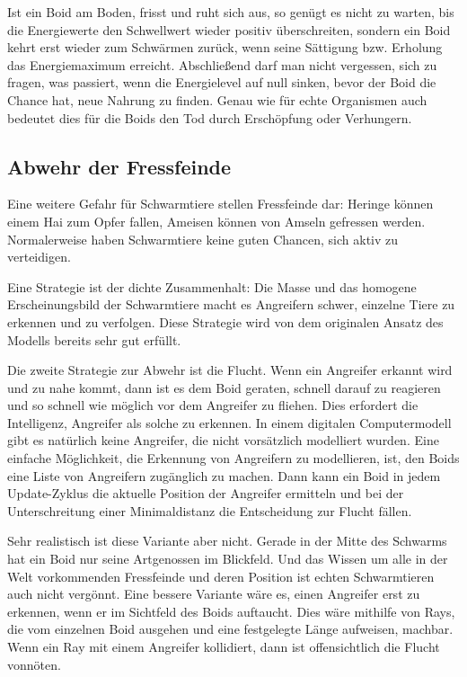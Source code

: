 \documentclass[draft=false
              ,paper=a4
              ,twoside=false
              ,fontsize=11pt
              ,headsepline
              ,BCOR10mm
              ,DIV11
              ,bibtotoc
              ,liststotoc
              ]{scrbook}
\begin{document}
Ist ein Boid am Boden, frisst und ruht sich aus, so genügt es nicht zu warten, bis die Energiewerte den Schwellwert wieder positiv überschreiten, sondern ein Boid kehrt erst wieder zum Schwärmen zurück, wenn seine Sättigung bzw. Erholung das Energiemaximum erreicht.
Abschließend darf man nicht vergessen, sich zu fragen, was passiert, wenn die Energielevel auf null sinken, bevor der Boid die Chance hat, neue Nahrung zu finden. Genau wie für echte Organismen auch bedeutet dies für die Boids den Tod durch Erschöpfung oder Verhungern.
\subsection{Abwehr der Fressfeinde}\label{enemy}
Eine weitere Gefahr für Schwarmtiere stellen Fressfeinde dar: Heringe können einem Hai zum Opfer fallen, Ameisen können von Amseln gefressen werden. Normalerweise haben Schwarmtiere keine guten Chancen, sich aktiv zu verteidigen.

Eine Strategie ist der dichte Zusammenhalt: Die Masse und das homogene Erscheinungsbild der Schwarmtiere macht es Angreifern schwer, einzelne Tiere zu erkennen und zu verfolgen. Diese Strategie wird von dem originalen Ansatz des Modells bereits sehr gut erfüllt.

Die zweite Strategie zur Abwehr ist die Flucht. Wenn ein Angreifer erkannt wird und zu nahe kommt, dann ist es dem Boid geraten, schnell darauf zu reagieren und so schnell wie möglich vor dem Angreifer zu fliehen. Dies erfordert die Intelligenz, Angreifer als solche zu erkennen. In einem digitalen Computermodell gibt es natürlich keine Angreifer, die nicht vorsätzlich modelliert wurden. Eine einfache Möglichkeit, die Erkennung von Angreifern zu modellieren, ist, den Boids eine Liste von Angreifern zugänglich zu machen. Dann kann ein Boid in jedem Update-Zyklus die aktuelle Position der Angreifer ermitteln und bei der Unterschreitung einer Minimaldistanz die Entscheidung zur Flucht fällen.

Sehr realistisch ist diese Variante aber nicht. Gerade in der Mitte des Schwarms hat ein Boid nur seine Artgenossen im Blickfeld. Und das Wissen um alle in der Welt vorkommenden Fressfeinde und deren Position ist echten Schwarmtieren auch nicht vergönnt.
Eine bessere Variante wäre es, einen Angreifer erst zu erkennen, wenn er im Sichtfeld des Boids auftaucht. Dies wäre mithilfe von Rays, die vom einzelnen Boid ausgehen und eine festgelegte Länge aufweisen, machbar. Wenn ein Ray mit einem Angreifer kollidiert, dann ist offensichtlich die Flucht vonnöten.
\end{document}
